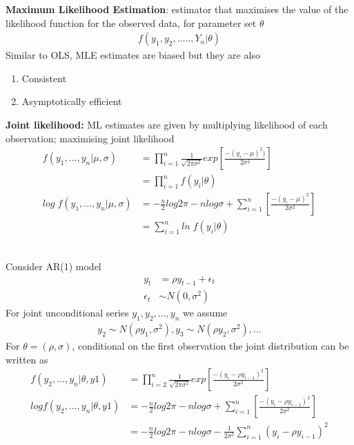 \documentclass{beamer}
\begin{document}
\begin{frame}
  \textbf{Maximum Likelihood Estimation}: estimator that maximises the value of the likelihood function for the observed data, for parameter set $\theta$
  \begin{align}
    f(y_1,y_2,.....,Y_n| \theta)
  \end{align}
  \medskip
  Similar to OLS, MLE estimates are biased but they are also
  \begin{enumerate}
    \item Consistent
    \item Asymptotically efficient
  \end{enumerate}  
\end{frame}

\begin{frame}  
  \textbf{Joint likelihood:} ML estimates are given by multiplying likelihood of each observation; maximising joint likelihood  
\begin{align}
  f(y_1,...,y_n| \mu, \sigma) &= \prod^n_{i=1} \frac{1}{\sqrt{2\pi \sigma^2}} exp \left [ \frac{-(y_i-\mu)^2)}{2\sigma^2} \right ] \\ \nonumber
  &= \prod^n_{i=1} f(y_i| \theta)\\
  log \;f(y_1,...,y_n| \mu, \sigma) &= -\frac{n}{2} log 2\pi - n log \sigma + \sum^n_{i=1} \left [ \frac{-(y_i-\mu)^2}{2\sigma^2} \right ] \\ \nonumber
  &= \sum^n_{i=1} ln\; f(y_i| \theta)
\end{align}\
\end{frame}

\begin{frame}
  Consider AR(1) model
  \begin{align}
  y_t&= \rho y_{t-1} + \epsilon_t \\ 
   \epsilon_t &\sim N(0, \sigma^2)
  \end{align}
  For joint unconditional series $y_1,y_2,...,y_n$ we assume
  \begin{align}
     y_2\sim N(\rho y_1,\sigma^2), y_3\sim N(\rho y_2,\sigma^2),... 
   \end{align} 
   \medskip  
  For $\theta= (\rho, \sigma)$, conditional on the first observation the joint distribution can be written as
\begin{align}
  f(y_2,...,y_n| \theta, y1) &= \prod^n_{i=2} \frac{1}{\sqrt{2 \pi \sigma^2}} exp \left [ \frac{-(y_i - \rho y_{i-1})^2}{2\sigma^2} \right ] \\
  log f(y_2,...,y_n| \theta, y1) &= -\frac{n}{2} log 2\pi - n log \sigma + \sum^n_{i=1} 
  \left [ \frac{-(y_i-\rho y_{i-1})^2}{2\sigma^2} \right ]\\ \nonumber
  &=  -\frac{n}{2} log 2\pi - n log \sigma - \frac{1}{2\sigma^2} \sum^n_{i=1}(y_i-\rho y_{i-1})^2
\end{align}
\end{frame}
\end{document}
